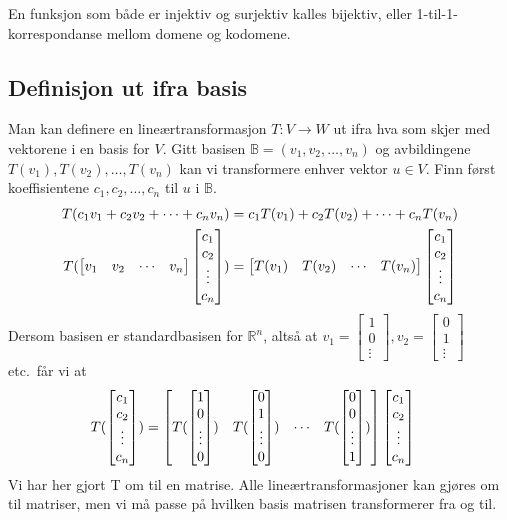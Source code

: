 \documentclass[12pt,a4paper,norsk]{article}
\makeatletter
\newcommand{\R}{\mathbb{R}}
\newcommand{\B}{\mathbb{B}}
\newcommand{\imat}[1]{\left[\begin{smallmatrix}#1\end{smallmatrix}\right]} %
\newcommand{\mat}[2]{\left[\begin{array}{@{}#1@{}}#2\end{array}\right]}
\makeatother
\begin{document}
En funksjon som både er injektiv og surjektiv kalles bijektiv, eller
1-til-1-korrespondanse mellom domene og kodomene.

\subsection{Definisjon ut ifra basis}
Man kan definere en lineærtransformasjon $T:V\rightarrow W$ ut ifra hva som
skjer med vektorene i en basis for $V$. Gitt basisen $\B = (v_{1}, v_{2}, \ldots, v_{n})$
og avbildingene $T(v_{1}), T(v_{2}), \ldots, T(v_{n})$ kan vi transformere enhver
vektor $u \in V$. Finn først koeffisientene $c_{1}, c_{2}, \ldots, c_{n}$ til $u$ i $\B$.
\begin{align*}
  T(c_{1}v_{1} + c_{2}v_{2} + \cdots + c_{n}v_{n}) &= c_{1}T(v_{1}) + c_{2}T(v_{2})+ \cdots + c_{n}T(v_{n}) \\
  T(\mat{cccc}{v_{1} & v_{2} & \cdots & v_{n}}\mat{c}{c_{1} \\ c_{2} \\ \vdots \\ c_{n}}) &= \mat{cccc}{T(v_{1}) & T(v_{2}) & \cdots & T(v_{n})}\mat{c}{c_{1} \\ c_{2} \\ \vdots \\ c_{n}}
\end{align*}
Dersom basisen er standardbasisen for $\R^{n}$, altså at
$v_{1} = \imat{1 \\ 0 \\ \vdots}, v_{2} = \imat{0 \\ 1 \\ \vdots}$ etc.\ får vi at
\begin{align*}
  T(\mat{c}{c_{1} \\ c_{2} \\ \vdots \\ c_{n}}) &= \mat{cccc}{T(\mat{c}{1 \\ 0 \\ \vdots \\ 0}) & T(\mat{c}{0 \\ 1 \\ \vdots \\ 0}) & \cdots & T(\mat{c}{0 \\ 0 \\ \vdots \\ 1})}\mat{c}{c_{1} \\ c_{2} \\ \vdots \\ c_{n}}
\end{align*}
Vi har her gjort T om til en matrise. Alle lineærtransformasjoner kan gjøres om
til matriser, men vi må passe på hvilken basis matrisen transformerer fra og
til.
\end{document}
